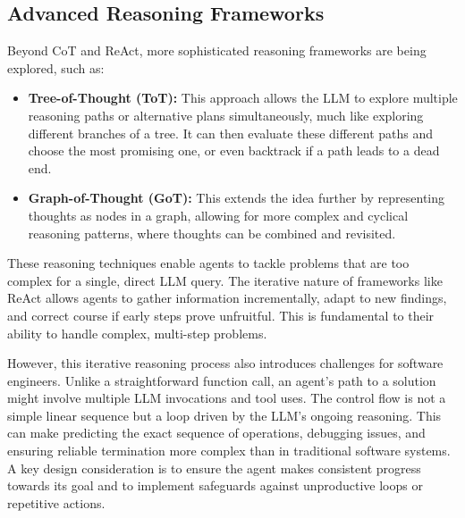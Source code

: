 \subsection*{Advanced Reasoning Frameworks}
Beyond CoT and ReAct, more sophisticated reasoning frameworks are being explored, such as:

\begin{itemize}
    \item \textbf{Tree-of-Thought (ToT):} This approach allows the LLM to explore multiple reasoning paths or alternative plans simultaneously,
     much like exploring different branches of a tree. It can then evaluate these different paths and choose the most promising one, or even backtrack 
     if a path leads to a dead end.
    \item \textbf{Graph-of-Thought (GoT):} This extends the idea further by representing thoughts as nodes in a graph, allowing for more complex and 
    cyclical reasoning patterns, where thoughts can be combined and revisited.
\end{itemize}

These reasoning techniques enable agents to tackle problems that are too complex for a single, direct LLM query. The iterative nature of frameworks
 like ReAct allows agents to gather information incrementally, adapt to new findings, and correct course if early steps prove unfruitful. 
 This is fundamental to their ability to handle complex, multi-step problems.

However, this iterative reasoning process also introduces challenges for software engineers. Unlike a straightforward function call, an 
agent's path to a solution might involve multiple LLM invocations and tool uses. The control flow is not a simple linear sequence but a loop 
driven by the LLM's ongoing reasoning. This can make predicting the exact sequence of operations, debugging issues, and ensuring reliable 
termination more complex than in traditional software systems. A key design consideration is to ensure the agent makes consistent progress 
towards its goal and to implement safeguards against unproductive loops or repetitive actions. 